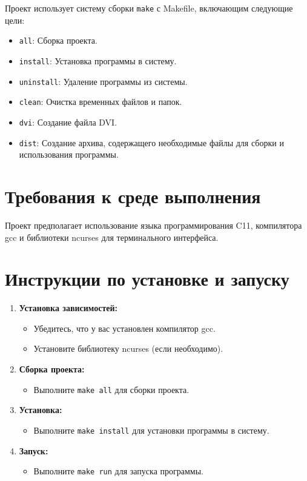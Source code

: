 \documentclass{article}
\begin{document}
Проект использует систему сборки \texttt{make} с Makefile, включающим следующие цели:

\begin{itemize}
    \item \texttt{all}: Сборка проекта.
    \item \texttt{install}: Установка программы в систему.
    \item \texttt{uninstall}: Удаление программы из системы.
    \item \texttt{clean}: Очистка временных файлов и папок.
    \item \texttt{dvi}: Создание файла DVI.
    \item \texttt{dist}: Создание архива, содержащего необходимые файлы для сборки и использования программы.
\end{itemize}

\section{Требования к среде выполнения}

Проект предполагает использование языка программирования C11, компилятора gcc и библиотеки ncurses для терминального интерфейса.

\section{Инструкции по установке и запуску}

\begin{enumerate}
    \item \textbf{Установка зависимостей:}
        \begin{itemize}
            \item Убедитесь, что у вас установлен компилятор gcc.
            \item Установите библиотеку ncurses (если необходимо).
        \end{itemize}
    \item \textbf{Сборка проекта:}
        \begin{itemize}
            \item Выполните \texttt{make all} для сборки проекта.
        \end{itemize}
    \item \textbf{Установка:}
        \begin{itemize}
            \item Выполните \texttt{make install} для установки программы в систему.
        \end{itemize}
    \item \textbf{Запуск:}
        \begin{itemize}
            \item Выполните \texttt{make run} для запуска программы.
        \end{itemize}
\end{enumerate}
\end{document}
